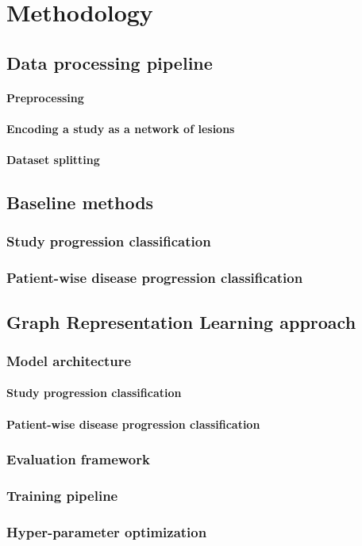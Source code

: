 \chapter{Methodology}

\section{Data processing pipeline}

\subsubsection{Preprocessing}

\subsubsection{Encoding a study as a network of lesions}

\subsubsection{Dataset splitting}

\section{Baseline methods}

\subsection{Study progression classification}

\subsection{Patient-wise disease progression classification}

\section{Graph Representation Learning approach}

\subsection{Model architecture}

\subsubsection{Study progression classification}

\subsubsection{Patient-wise disease progression classification}

\subsection{Evaluation framework}

\subsection{Training pipeline}

\subsection{Hyper-parameter optimization}

